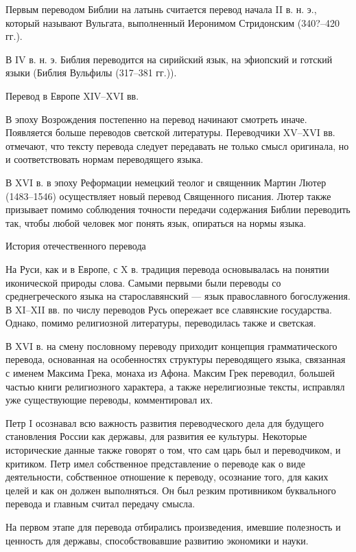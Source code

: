 Первым переводом Библии на латынь считается перевод начала II в. н. э., который называют Вульгата, выполненный Иеронимом Стридонским (340?--420 гг.).

В IV в. н. э. Библия переводится на сирийский язык, на эфиопский и готский языки (Библия Вульфилы (317--381 гг.)).

Перевод в Европе XIV--XVI вв.

В эпоху Возрождения постепенно на перевод начинают смотреть иначе. Появляется больше переводов светской литературы. Переводчики XV--XVI вв. отмечают, что тексту перевода следует передавать не только смысл оригинала, но и соответствовать нормам переводящего языка.

В XVI в. в эпоху Реформации немецкий теолог и священник Мартин Лютер (1483--1546) осуществляет новый перевод Священного писания. Лютер также призывает помимо соблюдения точности передачи содержания Библии переводить так, чтобы любой человек мог понять язык, опираться на нормы языка.

История отечественного перевода

На Руси, как и в Европе, с X в. традиция перевода основывалась на понятии иконической природы слова. Самыми первыми были переводы со среднегреческого языка на старославянский --- язык православного богослужения. В XI--XII вв. по числу переводов Русь опережает все славянские государства. Однако, помимо религиозной литературы, переводилась также и светская.

В XVI в. на смену пословному переводу приходит концепция грамматического перевода, основанная на особенностях структуры переводящего языка, связанная с именем Максима Грека, монаха из Афона. Максим Грек переводил, большей частью книги религиозного характера, а также нерелигиозные тексты, исправлял уже существующие переводы, комментировал их.

Петр I осознавал всю важность развития переводческого дела для будущего становления России как державы, для развития ее культуры. Некоторые исторические данные также говорят о том, что сам царь был и переводчиком, и критиком. Петр имел собственное представление о переводе как о виде деятельности, собственное отношение к переводу, осознание того, для каких целей и как он должен выполняться. Он был резким противником буквального перевода и главным считал передачу смысла.

На первом этапе для перевода отбирались произведения, имевшие полезность и ценность для державы, способствовавшие развитию экономики и науки.

